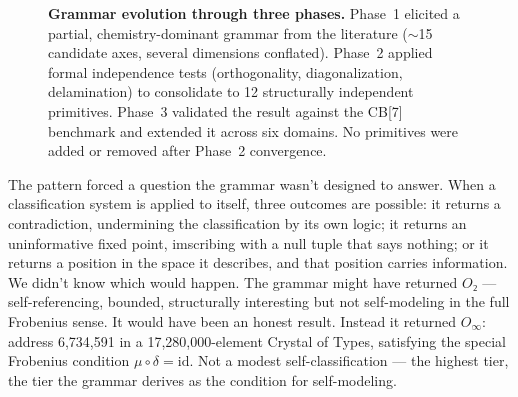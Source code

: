 \documentclass[12pt,a4paper]{article}
\newcommand{\Oinf}{O_\infty}
\newcommand{\Otwo}{O₂}
\begin{document}
\begin{figure}[H]
\centering
{}
\caption{\textbf{Grammar evolution through three phases.}
Phase~1 elicited a partial, chemistry-dominant grammar from the literature
($\sim$15 candidate axes, several dimensions conflated). Phase~2 applied formal
independence tests (orthogonality, diagonalization, delamination) to consolidate
to 12 structurally independent primitives. Phase~3 validated the result against
the CB[7] benchmark and extended it across six domains. No primitives were added
or removed after Phase~2 convergence.}
\label{fig:grammar_evolution}
\end{figure}

The pattern forced a question the grammar wasn't designed to answer.
When a classification system is applied to itself, three outcomes
are possible: it returns a contradiction, undermining the
classification by its own logic; it returns an uninformative fixed
point, imscribing with a null tuple that says nothing; or it returns
a position in the space it describes, and that position carries
information. We didn't know which would happen. The grammar might
have returned $\Otwo$ --- self-referencing, bounded, structurally
interesting but not self-modeling in the full Frobenius sense.
It would have been an honest result. Instead it returned $\Oinf$:
address 6,734,591 in a 17,280,000-element Crystal of Types,
satisfying the special Frobenius condition $\mu \circ \delta =
\text{id}$. Not a modest self-classification --- the highest tier,
the tier the grammar derives as the condition for self-modeling.
\end{document}
